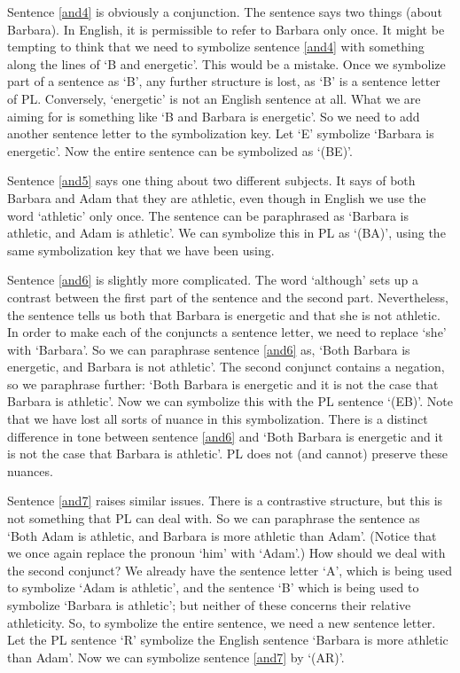 Sentence \ref{and4} is obviously a conjunction. The sentence says two things (about Barbara). In English, it is permissible to refer to Barbara only once. It might be tempting to think that we need to symbolize sentence \ref{and4} with something along the lines of ‘B and energetic’. This would be a mistake. Once we symbolize part of a sentence as ‘B’, any further structure is lost, as ‘B’ is a sentence letter of PL. Conversely, ‘energetic’ is not an English sentence at all. What we are aiming for is something like ‘B and Barbara is energetic’. So we need to add another sentence letter to the symbolization key. Let ‘E’ symbolize ‘Barbara is energetic’. Now the entire sentence can be symbolized as ‘(B\eand E)’.

Sentence \ref{and5} says one thing about two different subjects. It says of both Barbara and Adam that they are athletic, even though in English we use the word ‘athletic’ only once. The sentence can be paraphrased as ‘Barbara is athletic, and Adam is athletic’. We can symbolize this in PL as ‘(B\eand A)’, using the same symbolization key that we have been using.

Sentence \ref{and6} is slightly more complicated. The word ‘although’ sets up a contrast between the first part of the sentence and the second part. Nevertheless, the sentence tells us both that Barbara is energetic and that she is not athletic. In order to make each of the conjuncts a sentence letter, we need to replace ‘she’ with ‘Barbara’. So we can paraphrase sentence \ref{and6} as, ‘Both Barbara is energetic, and Barbara is not athletic’. The second conjunct contains a negation, so we paraphrase further: ‘Both Barbara is energetic and it is not the case that Barbara is athletic’. Now we can symbolize this with the PL sentence ‘(E\eand \enot B)’. Note that we have lost all sorts of nuance in this symbolization. There is a distinct difference in tone between sentence \ref{and6} and ‘Both Barbara is energetic and it is not the case that Barbara is athletic’. PL does not (and cannot) preserve these nuances.

Sentence \ref{and7} raises similar issues. There is a contrastive structure, but this is not something that PL can deal with. So we can paraphrase the sentence as ‘Both Adam is athletic, and Barbara is more athletic than Adam’. (Notice that we once again replace the pronoun ‘him’ with ‘Adam’.) How should we deal with the second conjunct? We already have the sentence letter ‘A’, which is being used to symbolize ‘Adam is athletic’, and the sentence ‘B’ which is being used to symbolize ‘Barbara is athletic’; but neither of these concerns their relative athleticity. So, to symbolize the entire sentence, we need a new sentence letter. Let the PL sentence ‘R’ symbolize the English sentence ‘Barbara is more athletic than Adam’. Now we can symbolize sentence  \ref{and7} by ‘(A\eand R)’.

